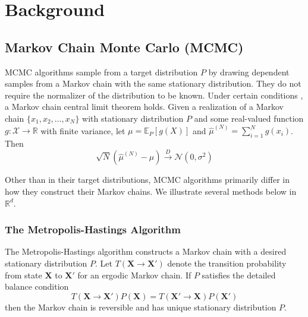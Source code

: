 \documentclass[a4paper,11pt]{article}
\newcommand{\E}{\mathbb{E}}
\begin{document}
\label{section:intro}
\section{Background}
\subsection{Markov Chain Monte Carlo (MCMC)}
MCMC algorithms sample from a target distribution $P$ by drawing dependent samples from a Markov chain with the same stationary distribution. They do not require the normalizer of the distribution to be known. Under certain conditions \cite{jones_markov_2004}, a Markov chain central limit theorem holds. Given a realization of a Markov chain $\{x_{1}, x_{2}, \ldots, x_{N}\}$ with stationary distribution $P$ and some real-valued function $g:\mathcal{X} \rightarrow \mathbb{R}$ with finite variance, let $\mu = \E_{P}[g(X)]$ and $\hat{\mu}^{(N)} = \sum_{i=1}^{N}g(x_{i})$. Then
\begin{equation}
    \sqrt{N}(\hat{\mu}^{(N)} - \mu) \overset{D}{\rightarrow} \mathcal{N}(0, \sigma^{2})
    \label{eq:mcmc_clt}
\end{equation}

Other than in their target distributions, MCMC algorithms primarily differ in how they construct their Markov chains. We illustrate several methods below in $\mathbb{R}^{d}$.

\subsubsection{The Metropolis-Hastings Algorithm}
The Metropolis-Hastings algorithm \cite{metropolis_equation_1953,hastings_monte_1970} constructs a Markov chain with a desired stationary distribution $P$. Let $T(\mathbf{X} \rightarrow \mathbf{X}')$ denote the transition probability from state $\mathbf{X}$ to $\mathbf{X'}$ for an ergodic Markov chain. If $P$ satisfies the detailed balance condition
\begin{equation}
   T(\mathbf{X} \rightarrow \mathbf{X}') P(\mathbf{X}) = T(\mathbf{X}' \rightarrow \mathbf{X}) P(\mathbf{X}')
   \label{eq:dbc}
\end{equation}
then the Markov chain is reversible and has unique stationary distribution $P$. 
\end{document}
